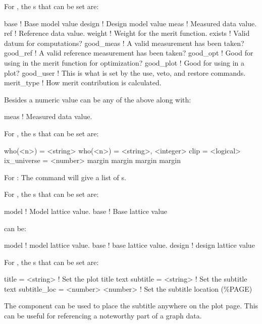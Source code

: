 For , the s that can be set are:
\begin{example}
  base        ! Base model value
  design      ! Design model value
  meas        ! Measured data value.
  ref         ! Reference data value.
  weight      ! Weight for the merit function.
  exists      ! Valid datum for computations?
  good_meas   ! A valid measurement has been taken?
  good_ref    ! A valid reference measurement has been taken?
  good_opt    ! Good for using in the merit function for optimization?
  good_plot   ! Good for using in a plot?
  good_user   ! This is what is set by the use, veto, and restore commands.
  merit_type  ! How merit contribution is calculated.
\end{example}
Besides a numeric value  can be any of the above along with:
\begin{example}
  meas        ! Measured data value.
\end{example}
\vskip 0.2in

For , the s that can be set are:
\begin{example}
  who(<n>)    = <string>
  who(<n>)    = <string>, <integer>
  clip        = <logical>
  ix_universe = <number>
  margin%
  margin%
  margin%
  margin%
\end{example}
\vskip 0.2in

For : The  command will give a list of 
s.
\vskip 0.2in

For , the s that can be set are:
\begin{example}
  model      ! Model lattice value.
  base       ! Base lattice value
\end{example}
 can be:
\begin{example}
  model       ! model lattice value.
  base        ! base lattice value.
  design      ! design lattice value
\end{example}
\vskip 0.2in

For , the s that can be set are:
\begin{example}
  title        = <string>          ! Set the plot title text
  subtitle     = <string>          ! Set the subtitle text
  subtitle_loc = <number> <number> ! Set the subtitle location (\%PAGE)
\end{example}
The  component can be used to place the subtitle anywhere on
the plot page. This can be useful for referencing a noteworthy part of a graph
data.
\vskip 0.2in

